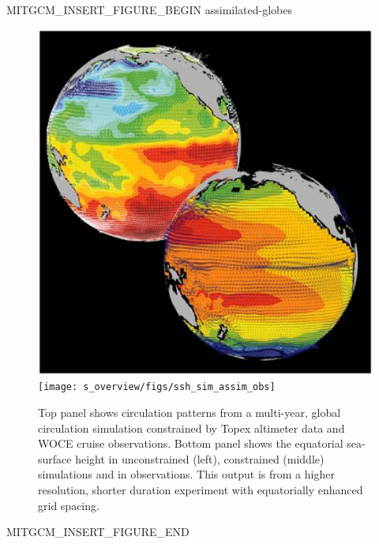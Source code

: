 \begin{rawhtml}MITGCM_INSERT_FIGURE_BEGIN assimilated-globes\end{rawhtml}
\begin{figure}
 \begin{center}
   \includegraphics*[width=.5\textwidth]{s_overview/figs/globes.eps}
\\
   \texttt{[image: s\_overview/figs/ssh\_sim\_assim\_obs]}
 \end{center}
\caption{Top panel shows circulation patterns from a
multi-year, global circulation simulation constrained by Topex altimeter
data and WOCE cruise observations. Bottom panel shows the equatorial
sea-surface height in unconstrained (left), constrained (middle) simulations
and in observations. This output is from a higher resolution, shorter
duration experiment with equatorially enhanced grid spacing.}
\label{fig:assimilated-globes}
\end{figure}
\begin{rawhtml}MITGCM_INSERT_FIGURE_END\end{rawhtml}
